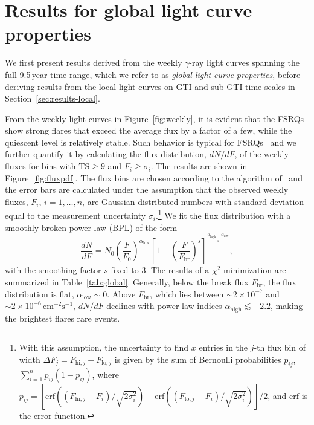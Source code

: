 \documentclass[twocolumn,linenumbers]{aastex62}
\newcommand{\gray}{$\gamma$-ray\xspace}
\begin{document}
\section{Results for global light curve properties}
\label{sec:results-global}
We first present results derived from the weekly \gray light curves spanning the full 9.5\,year time range, which we refer to as \emph{global light curve properties}, before deriving results from the local light curves on GTI and sub-GTI time scales in Section~\ref{sec:results-local}.

From the weekly light curves in Figure~\ref{fig:weekly}, it is evident that the FSRQs show strong flares that exceed the average flux by a factor of a few, while the quiescent level is relatively stable. 
Such behavior is typical for FSRQs~\citet{} and we 
further quantify it by calculating the flux distribution, $dN/dF$, of the weekly fluxes for bins with $\mathrm{TS} \geqslant 9$ and $F_i \geqslant \sigma_i$. 
The results are shown in Figure~\ref{fig:fluxpdf}. The flux bins are chosen according to the algorithm of~\citet{knuth2006} and the error bars are calculated under the assumption that the observed weekly fluxes, $F_i$, $i = 1,\ldots,n$, are Gaussian-distributed numbers with standard deviation equal to the measurement uncertainty $\sigma_i$.\footnote{
With this assumption, the uncertainty to find $x$ entries in the $j$-th flux bin of width $\Delta F_j = F_{\mathrm{hi},j} - F_{\mathrm{lo},j}$ is given by the sum of Bernoulli probabilities $p_{ij}$, $\sum_{i = 1}^n p_{ij}(1-p_{ij})$, where $p_{ij} =  \left[\mathrm{erf}\left((F_{\mathrm{hi},j} - F_i) / \sqrt{2\sigma_i^2}\right) - \mathrm{erf}\left((F_{\mathrm{lo},j} - F_i) / \sqrt{2\sigma_i^2}\right)\right]/2$, and $\mathrm{erf}$ is the error function.
}
We fit the flux distribution with a smoothly broken power law (BPL) of the form 
\begin{equation}
    \frac{dN}{dF} = N_0 \left( \frac{F}{F_0}\right)^{\alpha_\mathrm{low}}
        \left[ 1 - \left(\frac{F}{F_\mathrm{br}}\right)^s \right]^{\frac{\alpha_\mathrm{high} - \alpha_\mathrm{low}}{s}},
        \label{eq:dndf}
\end{equation}
with the smoothing factor $s$ fixed to 3. 
The results of a $\chi^2$ minimization are summarized in Table~\ref{tab:global}.
Generally, below the break flux $F_\mathrm{br}$, the flux distribution is flat, $\alpha_\mathrm{low}\sim 0$.
Above $F_\mathrm{br}$, 
which lies between $\sim2\times10^{-7}$ and $\sim2\times10^{-6}\,\mathrm{cm}^{-2}\mathrm{s}^{-1}$, $dN/dF$ declines  with power-law indices $\alpha_\mathrm{high} \lesssim -2.2$, making the brightest flares rare events.
\end{document}
